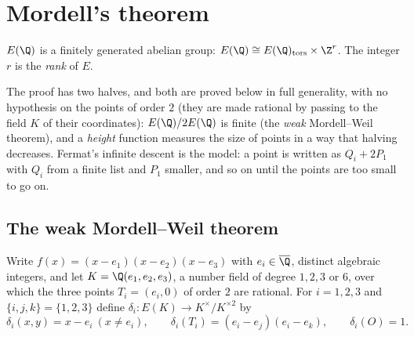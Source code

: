 \section{Mordell's theorem}

\begin{theorem}\label{thm:mordell}
$E(\Q)$ is a finitely generated abelian group: $E(\Q)\cong E(\Q)_{\mathrm{tors}}\times\Z^r$. The integer $r$ is the \emph{rank} of $E$.
\end{theorem}

The proof has two halves, and both are proved below in full generality, with no hypothesis on the points of order $2$ (they are made rational by
passing to the field $K$ of their coordinates): $E(\Q)/2E(\Q)$ is finite (the \emph{weak} Mordell--Weil theorem), and a \emph{height} function measures the size of
points in a way that halving decreases. Fermat's infinite descent is the model: a point is written as $Q_i+2P_1$ with $Q_i$ from a finite list and
$P_1$ smaller, and so on until the points are too small to go on.

\subsection*{The weak Mordell--Weil theorem}

Write $f(x)=(x-e_1)(x-e_2)(x-e_3)$ with $e_i\in\overline{\Q}$, distinct algebraic integers, and let $K=\Q(e_1,e_2,e_3)$, a number field of degree $1,2,3$ or $6$,
over which the three points $T_i=(e_i,0)$ of order $2$ are rational. For $i=1,2,3$ and $\{i,j,k\}=\{1,2,3\}$ define
$\delta_i:E(K)\to K^\times/K^{\times2}$ by
\[
\delta_i(x,y)=x-e_i\ (x\ne e_i),\qquad\delta_i(T_i)=(e_i-e_j)(e_i-e_k),\qquad\delta_i(O)=1.
\]

